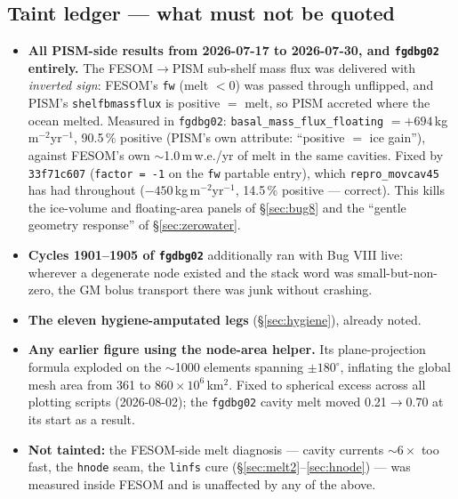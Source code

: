 \documentclass[11pt,a4paper]{article}
\newcommand{\code}[1]{\texttt{\small #1}}
\begin{document}
\subsection{Taint ledger --- what must not be quoted}
\begin{itemize}
\item \textbf{All PISM-side results from 2026-07-17 to 2026-07-30, and \code{fgdbg02} entirely.}
  The FESOM$\to$PISM sub-shelf mass flux was delivered with \emph{inverted sign}: FESOM's \code{fw}
  (melt $<0$) was passed through unflipped, and PISM's \code{shelfbmassflux} is positive $=$ melt,
  so PISM accreted where the ocean melted. Measured in \code{fgdbg02}:
  \code{basal\_mass\_flux\_floating} $=+694$\,kg\,m$^{-2}$yr$^{-1}$, 90.5\,\% positive
  (PISM's own attribute: ``positive $=$ ice gain''), against FESOM's own $\sim$1.0\,m\,w.e./yr of
  melt in the same cavities. Fixed by \code{33f71c607} (\code{factor = -1} on the \code{fw}
  partable entry), which \code{repro\_movcav45} has had throughout
  ($-450$\,kg\,m$^{-2}$yr$^{-1}$, 14.5\,\% positive --- correct). This kills the ice-volume and
  floating-area panels of \S\ref{sec:bug8} and the ``gentle geometry response'' of
  \S\ref{sec:zerowater}.
\item \textbf{Cycles 1901--1905 of \code{fgdbg02}} additionally ran with Bug VIII live: wherever a
  degenerate node existed and the stack word was small-but-non-zero, the GM bolus transport there
  was junk without crashing.
\item \textbf{The eleven hygiene-amputated legs} (\S\ref{sec:hygiene}), already noted.
\item \textbf{Any earlier figure using the node-area helper.} Its plane-projection formula exploded
  on the $\sim$1000 elements spanning $\pm180^\circ$, inflating the global mesh area from 361 to
  $860\times10^6$\,km$^2$. Fixed to spherical excess across all plotting scripts (2026-08-02); the
  \code{fgdbg02} cavity melt moved 0.21$\to$0.70 at its start as a result.
\item \textbf{Not tainted:} the FESOM-side melt diagnosis --- cavity currents $\sim6\times$ too
  fast, the \code{hnode} seam, the \code{linfs} cure (\S\ref{sec:melt2}--\ref{sec:hnode}) --- was
  measured inside FESOM and is unaffected by any of the above.
\end{itemize}
\end{document}
